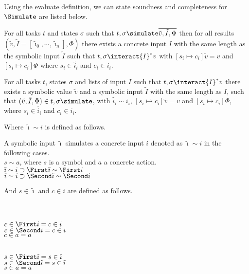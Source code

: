 Using the evaluate definition, we can state soundness and completeness for $\Simulate$ are listed below.

\begin{lemma}
  \label{lem:soundsimulate}
  For all tasks $t$ and states $\sigma$
  such that $t,\sigma\simulate\overline{\tilde{v},\tilde{I},\Phi}$
  then for all results $(\tilde{v},\tilde{I}=[\tilde{\imath}_0,\cdots,\tilde{\imath}_n],\Phi)$
  there exists a concrete input $I$ with the same length as the symbolic input $\tilde{I}$
  such that $t,\sigma\interact{I}^*v$
  with $[s_i\mapsto c_i]\tilde{v}=v$ and $[s_i\mapsto c_i]\Phi$
  where $s_i\in\tilde{i_i}$ and $c_i\in i_i$.
\end{lemma}

\begin{lemma}
  \label{lem:completesimulate}
  For all tasks $t$, states $\sigma$ and lists of input $I$
  such that $t,\sigma\interact{I}^*v$
  there exists a symbolic value $\tilde{v}$ and a symbolic input $\tilde{I}$ with the same length as $I$,
  such that $(\tilde{v},\tilde{I},\Phi)\in t,\sigma\simulate$,
  with $\tilde{i_i}\sim i_i$, $[s_i\mapsto c_i]\tilde{v}=v$ and $[s_i\mapsto c_i]\Phi$,
  where $s_i\in\tilde{i_i}$ and $c_i\in i_i$.
\end{lemma}

Where $\tilde{\imath}\sim i$ is defined as follows.

\begin{definition}
  A symbolic input $\tilde{\imath}$ simulates a concrete input $i$ denoted as $\tilde{\imath}\sim i$ in the following cases.\\
  $s\sim a$, where $s$ is a symbol and $a$ a concrete action.\\
  $\tilde{\imath}\sim i\implies \First \tilde{\imath} \sim \First i$\\
  $\tilde{\imath}\sim i\implies \Second \tilde{\imath} \sim \Second i$
\end{definition}

And $s\in \tilde{\imath}$ and $c\in i$ are defined as follows.\\
\\
\noindent
\begin{minipage}[c]{0.5\textwidth}
  \begin{definition}\\
    $c\in \First i = c\in i $\\
    $c\in \Second i = c\in i $\\
    $c\in a = a $
  \end{definition}
\end{minipage}
\begin{minipage}[c]{0.5\textwidth}
  \begin{definition}\\
    $s\in \First \tilde{\imath} = s\in \tilde{\imath} $\\
    $s\in \Second \tilde{\imath} = s\in \tilde{\imath} $\\
    $s\in a = a $
  \end{definition}
\end{minipage}\\
\\

